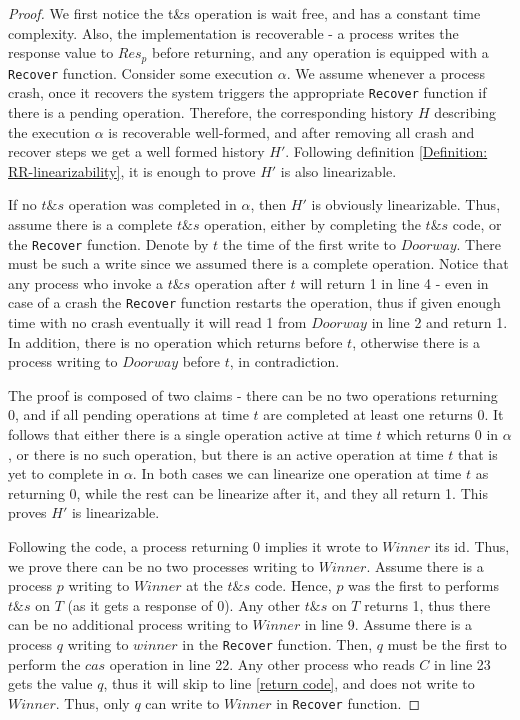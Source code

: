 \begin{proof}
	We first notice the t\&s operation is wait free, and has a constant time complexity. Also, the implementation is recoverable - a process writes the response value to $Res_p$ before returning, and any operation is equipped with a \texttt{Recover} function. Consider some execution $\alpha$. We assume whenever a process crash, once it recovers the system triggers the appropriate \texttt{Recover} function if there is a pending operation. Therefore, the corresponding history $H$ describing the execution $\alpha$ is recoverable well-formed, and after removing all crash and recover steps we get a well formed history $H'$. Following definition \ref{Definition: RR-linearizability}, it is enough to prove $H'$ is also linearizable.
	
	If no $t\&s$ operation was completed in $\alpha$, then $H'$ is obviously linearizable. Thus, assume there is a complete $t\&s$ operation, either by completing the $t\&s$ code, or the \texttt{Recover} function. Denote by $t$ the time of the first write to $Doorway$. There must be such a write since we assumed there is a complete operation. Notice that any process who invoke a $t\&s$ operation after $t$ will return 1 in line 4 - even in case of a crash the \texttt{Recover} function restarts the operation, thus if given enough time with no crash eventually it will read 1 from $Doorway$ in line 2 and return 1. In addition, there is no operation which returns before $t$, otherwise there is a process writing to $Doorway$ before $t$, in contradiction.
	
	The proof is composed of two claims - there can be no two operations returning 0, and if all pending operations at time $t$ are completed at least one returns 0. It follows that either there is a single operation active at time $t$ which returns 0 in $\alpha$, or there is no such operation, but there is an active operation at time $t$ that is yet to complete in $\alpha$. In both cases we can linearize one operation at time $t$ as returning 0, while the rest can be linearize after it, and they all return 1. This proves $H'$ is linearizable.
	
	Following the code, a process returning 0 implies it wrote to $Winner$ its id. Thus, we prove there can be no two processes writing to $Winner$.
	Assume there is a process $p$ writing to $Winner$ at the $t\&s$ code. Hence, $p$ was the first to performs $t\&s$ on $T$ (as it gets a response of 0). Any other $t\&s$ on $T$ returns 1, thus there can be no additional process writing to $Winner$ in line 9.
	Assume there is a process $q$ writing to $winner$ in the \texttt{Recover} function. Then, $q$ must be the first to perform the $cas$ operation in line 22. Any other process who reads $C$ in line 23 gets the value $q$, thus it will skip to line \ref{return code}, and does not write to $Winner$. Thus, only $q$ can write to $Winner$ in \texttt{Recover} function.
	

\end{proof}

